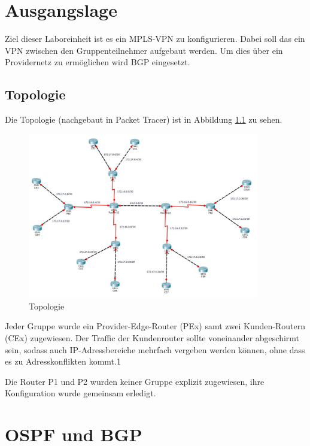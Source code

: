 \thispagestyle{standard}
\pagestyle{standard}
\chapter{Ausgangslage}

Ziel dieser Laboreinheit ist es ein \ac{MPLS}-VPN zu konfigurieren. Dabei soll das ein VPN zwischen den Gruppenteilnehmer aufgebaut werden. Um dies über ein Providernetz zu ermöglichen wird \ac{BGP} eingesetzt. 

\section{Topologie}

Die Topologie (nachgebaut in Packet Tracer) ist in Abbildung \ref{img:topo} zu sehen.

\begin{figure}[H]
	\centering
	\includegraphics[width=0.9\textwidth]{img/Topologie.JPG}
	\caption{Topologie}
	\label{img:topo}
\end{figure}

Jeder Gruppe wurde ein Provider-Edge-Router (PEx) samt zwei Kunden-Routern (CEx) zugewiesen. Der Traffic der Kundenrouter sollte voneinander abgeschirmt sein, sodass auch IP-Adressbereiche mehrfach vergeben werden können, ohne dass es zu Adresskonflikten kommt.1


Die Router P1 und P2 wurden keiner Gruppe explizit zugewiesen, ihre Konfiguration wurde gemeinsam erledigt.

\chapter{OSPF und BGP}

